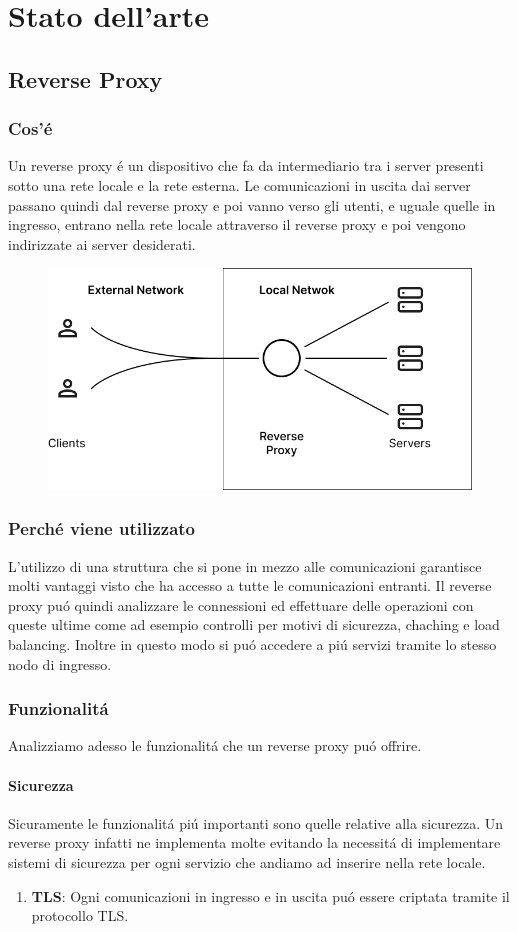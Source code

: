 \chapter{Stato dell'arte}
\label{cha:statoArte}

\section{Reverse Proxy}
\subsection{Cos'é}
Un reverse proxy é un dispositivo che fa da intermediario tra i server presenti sotto una rete locale e la rete esterna. Le comunicazioni in uscita dai server passano quindi dal reverse proxy e poi vanno verso gli utenti, e uguale quelle in ingresso, entrano nella rete locale attraverso il reverse proxy e poi vengono indirizzate ai server desiderati.
\begin{figure}[h!]
  \centering
  \includegraphics[width=.6\textwidth]{images/schema.png}
\end{figure}

\subsection{Perché viene utilizzato}
L'utilizzo di una struttura che si pone in mezzo alle comunicazioni garantisce molti vantaggi visto che ha accesso a tutte le comunicazioni entranti. Il reverse proxy puó quindi analizzare le connessioni ed effettuare delle operazioni con queste ultime come ad esempio controlli per motivi di sicurezza, chaching e  load balancing. Inoltre in questo modo si puó accedere a piú servizi tramite lo stesso nodo di ingresso.

\subsection{Funzionalitá}
Analizziamo adesso le funzionalitá che un reverse proxy puó offrire.

\subsubsection{Sicurezza}
Sicuramente le funzionalitá piú importanti sono quelle relative alla sicurezza. Un reverse proxy infatti ne implementa molte evitando la necessitá di implementare sistemi di sicurezza per ogni servizio che andiamo ad inserire nella rete locale.
\begin{enumerate}
  \item \textbf{TLS}: Ogni comunicazioni in ingresso e in uscita puó essere criptata tramite il protocollo TLS.

\end{enumerate}


